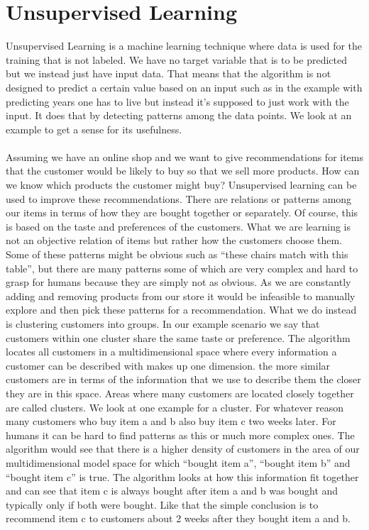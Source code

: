 \documentclass[a4paper,12pt]{report}
\begin{document}
	\section{Unsupervised Learning}
	Unsupervised Learning is a machine learning technique where data is used for the training that is not labeled. We have no target variable that is to be predicted but we instead just have input data. That means that the algorithm is not designed to predict a certain value based on an input such as in the example with predicting years one has to live but instead it’s supposed to just work with the input. It does that by detecting patterns among the data points. We look at an example to get a sense for its usefulness.\\\\
	Assuming we have an online shop and we want to give recommendations for items that the customer would be likely to buy so that we sell more products. How can we know which products the customer might buy? Unsupervised learning can be used to improve these recommendations. There are relations or patterns among our items in terms of how they are bought together or separately. Of course, this is based on the taste and preferences of the customers. What we are learning is not an objective relation of items but rather how the customers choose them. Some of these patterns might be obvious such as “these chairs match with this table”, but there are many patterns some of which are very complex and hard to grasp for humans because they are simply not as obvious. As we are constantly adding and removing products from our store it would be infeasible to manually explore and then pick these patterns for a recommendation. What we do instead is clustering customers into groups. In our example scenario we say that customers within one cluster share the same taste or preference. The algorithm locates all customers in a multidimensional space where every information a customer can be described with makes up one dimension. the more similar customers are in terms of the information that we use to describe them the closer they are in this space. Areas where many customers are located closely together are called clusters. We look at one example for a cluster. For whatever reason many customers who buy item a and b also buy item c two weeks later. For humans it can be hard to find patterns as this or much more complex ones. The algorithm would see that there is a higher density of customers in the area of our multidimensional model space for which “bought item a”, “bought item b” and “bought item c” is true. The algorithm looks at how this information fit together and can see that item c is always bought after item a and b was bought and typically only if both were bought. Like that the simple conclusion is to recommend item c to customers about 2 weeks after they bought item a and b.\\\\
\end{document}
